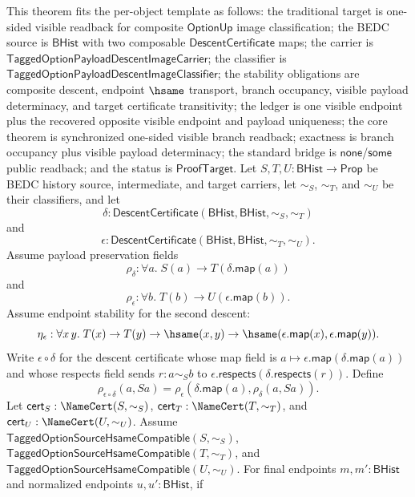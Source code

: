 \begin{theorem}
\label{thm:tagged-option-composite-image-classifier-normalized-one-sided-visible-branch-synchronization}
This theorem fits the per-object template as follows: the traditional target is
one-sided visible readback for composite $\mathsf{OptionUp}$ image
classification; the BEDC source is $\mathsf{BHist}$ with two composable
$\mathsf{DescentCertificate}$ maps; the carrier is
$\mathsf{TaggedOptionPayloadDescentImageCarrier}$; the classifier is
$\mathsf{TaggedOptionPayloadDescentImageClassifier}$; the stability obligations
are composite descent, endpoint $\hsame$ transport, branch occupancy, visible
payload determinacy, and target certificate transitivity; the ledger is one
visible endpoint plus the recovered opposite visible endpoint and payload
uniqueness; the core theorem is synchronized one-sided visible branch readback;
exactness is branch occupancy plus visible payload determinacy; the standard
bridge is $\mathsf{none}$/$\mathsf{some}$ public readback; and the status is
$\mathsf{ProofTarget}$.
Let $S,T,U:\mathsf{BHist}\to\mathsf{Prop}$ be BEDC history source,
intermediate, and target carriers, let $\sim_S$, $\sim_T$, and $\sim_U$ be their
classifiers, and let
$$
\delta:\mathsf{DescentCertificate}(\mathsf{BHist},\mathsf{BHist},\sim_S,\sim_T)
$$
and
$$
\epsilon:\mathsf{DescentCertificate}(\mathsf{BHist},\mathsf{BHist},\sim_T,\sim_U).
$$
Assume payload preservation fields
$$
\rho_{\delta}:\forall a.\;S(a)\to T(\delta.\mathsf{map}(a))
$$
and
$$
\rho_{\epsilon}:\forall b.\;T(b)\to U(\epsilon.\mathsf{map}(b)).
$$
Assume endpoint stability for the second descent:
$$
\eta_{\epsilon}:\forall x\,y.\;
T(x)\to T(y)\to \hsame(x,y)\to
\hsame(\epsilon.\mathsf{map}(x),\epsilon.\mathsf{map}(y)).
$$
Write $\epsilon\circ\delta$ for the descent certificate whose map field is
$a\mapsto\epsilon.\mathsf{map}(\delta.\mathsf{map}(a))$ and whose respects field
sends $r:a\sim_S b$ to
$\epsilon.\mathsf{respects}(\delta.\mathsf{respects}(r))$. Define
$$
\rho_{\epsilon\circ\delta}(a,Sa)=
\rho_{\epsilon}(\delta.\mathsf{map}(a),\rho_{\delta}(a,Sa)).
$$
Let $\mathsf{cert}_S:\NameCert(S,\sim_S)$,
$\mathsf{cert}_T:\NameCert(T,\sim_T)$, and
$\mathsf{cert}_U:\NameCert(U,\sim_U)$. Assume
$\mathsf{TaggedOptionSourceHsameCompatible}(S,\sim_S)$,
$\mathsf{TaggedOptionSourceHsameCompatible}(T,\sim_T)$, and
$\mathsf{TaggedOptionSourceHsameCompatible}(U,\sim_U)$. For final endpoints
$m,m':\mathsf{BHist}$ and normalized endpoints $u,u':\mathsf{BHist}$, if

\end{theorem}
